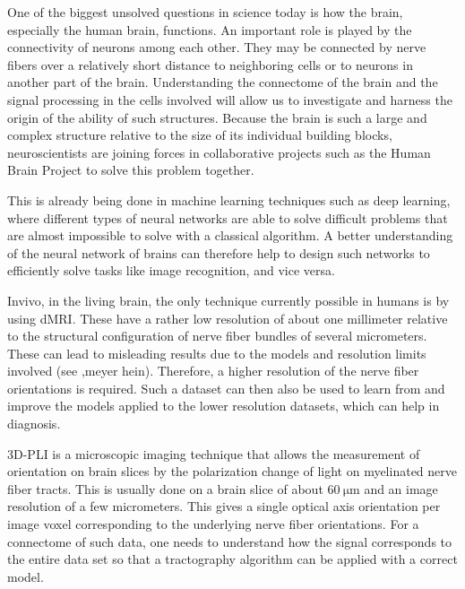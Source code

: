 % 
One of the biggest unsolved questions in science today is how the brain, especially the human brain, functions.
An important role is played by the connectivity of neurons among each other.
They may be connected by nerve fibers over a relatively short distance to neighboring cells or to neurons in another part of the brain.
Understanding the connectome of the brain and the signal processing in the cells involved will allow us to investigate and harness the origin of the ability of such structures.
Because the brain is such a large and complex structure relative to the size of its individual building blocks, neuroscientists are joining forces in collaborative projects such as the Human Brain Project to solve this problem together. \cite{Markram2006, Shen2012, Amunts2013, Amunts2016}
\par
% 
This is already being done in machine learning techniques such as deep learning, where different types of neural networks are able to solve difficult problems that are almost impossible to solve with a classical algorithm.
A better understanding of the neural network of brains can therefore help to design such networks to efficiently solve tasks like image recognition, and vice versa. \cite{murphy2013machine, Goodfellow-et-al-2016}
\par
% 
Invivo, \ie{} in the living brain, the only technique currently possible in humans is by using \ac{dMRI}.
These have a rather low resolution of about one millimeter relative to the structural configuration of nerve fiber bundles of several micrometers.
These can lead to misleading results due to the models and resolution limits involved (see ,meyer hein).
Therefore, a higher resolution of the nerve fiber orientations is required.
Such a dataset can then also be used to learn from and improve the models applied to the lower resolution datasets, which can help in diagnosis. \cite{MaierHein2017, Schilling2021, Yendiki2021}
\par
% 
\ac{3D-PLI} is a microscopic imaging technique that allows the measurement of orientation on brain slices by the polarization change of light on myelinated nerve fiber tracts.
This is usually done on a brain slice of about $\SI{60}{\micro\meter}$ and an image resolution of a few micrometers.
This gives a single optical axis orientation per image voxel corresponding to the underlying nerve fiber orientations.
For a connectome of such data, one needs to understand how the signal corresponds to the entire data set so that a tractography algorithm can be applied with a correct model.
